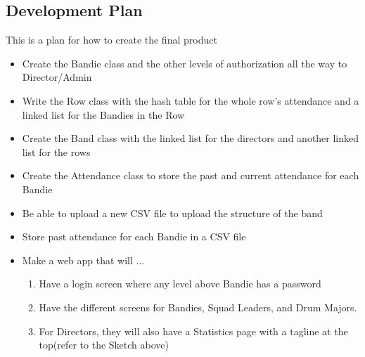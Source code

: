\documentclass{article}
\begin{document}
		\subsection{Development Plan}
			This is a plan for how to create the final product
			\begin{itemize}
				\item Create the Bandie class and the other levels of authorization all the way to Director/Admin
				\item Write the Row class with the hash table for the whole row’s attendance and a linked list for the Bandies in the Row
				\item Create the Band class with the linked list for the directors and another linked list for the rows
				\item Create the Attendance class to store the past and current attendance for each Bandie
				\item Be able to upload a new CSV file to upload the structure of the band
				\item Store past attendance for each Bandie in a CSV file
				\item Make a web app that will ...
					\begin{enumerate}
						\item Have a login screen where any level above Bandie has a password
						\item Have the different screens for Bandies, Squad Leaders, and Drum Majors.
						\item For Directors, they will also have a Statistics page with a tagline at the top(refer to the Sketch above)
					\end{enumerate}
			\end{itemize}
\end{document}
